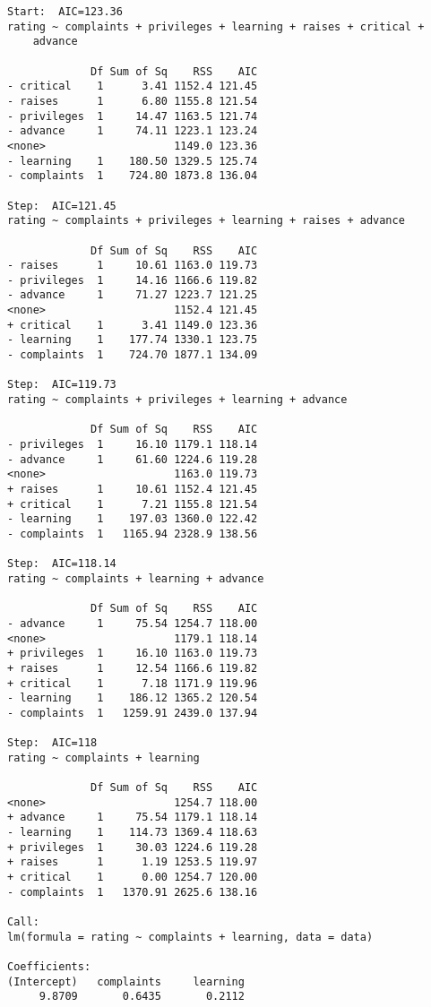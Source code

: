 \documentclass[11pt]{article}
\begin{document}
\begin{enumerate}
\begin{verbatim}
Start:  AIC=123.36
rating ~ complaints + privileges + learning + raises + critical + 
    advance

             Df Sum of Sq    RSS    AIC
- critical    1      3.41 1152.4 121.45
- raises      1      6.80 1155.8 121.54
- privileges  1     14.47 1163.5 121.74
- advance     1     74.11 1223.1 123.24
<none>                    1149.0 123.36
- learning    1    180.50 1329.5 125.74
- complaints  1    724.80 1873.8 136.04

Step:  AIC=121.45
rating ~ complaints + privileges + learning + raises + advance

             Df Sum of Sq    RSS    AIC
- raises      1     10.61 1163.0 119.73
- privileges  1     14.16 1166.6 119.82
- advance     1     71.27 1223.7 121.25
<none>                    1152.4 121.45
+ critical    1      3.41 1149.0 123.36
- learning    1    177.74 1330.1 123.75
- complaints  1    724.70 1877.1 134.09

Step:  AIC=119.73
rating ~ complaints + privileges + learning + advance

             Df Sum of Sq    RSS    AIC
- privileges  1     16.10 1179.1 118.14
- advance     1     61.60 1224.6 119.28
<none>                    1163.0 119.73
+ raises      1     10.61 1152.4 121.45
+ critical    1      7.21 1155.8 121.54
- learning    1    197.03 1360.0 122.42
- complaints  1   1165.94 2328.9 138.56

Step:  AIC=118.14
rating ~ complaints + learning + advance

             Df Sum of Sq    RSS    AIC
- advance     1     75.54 1254.7 118.00
<none>                    1179.1 118.14
+ privileges  1     16.10 1163.0 119.73
+ raises      1     12.54 1166.6 119.82
+ critical    1      7.18 1171.9 119.96
- learning    1    186.12 1365.2 120.54
- complaints  1   1259.91 2439.0 137.94

Step:  AIC=118
rating ~ complaints + learning

             Df Sum of Sq    RSS    AIC
<none>                    1254.7 118.00
+ advance     1     75.54 1179.1 118.14
- learning    1    114.73 1369.4 118.63
+ privileges  1     30.03 1224.6 119.28
+ raises      1      1.19 1253.5 119.97
+ critical    1      0.00 1254.7 120.00
- complaints  1   1370.91 2625.6 138.16

Call:
lm(formula = rating ~ complaints + learning, data = data)

Coefficients:
(Intercept)   complaints     learning  
     9.8709       0.6435       0.2112  


\end{verbatim}
\end{enumerate}
\end{document}
